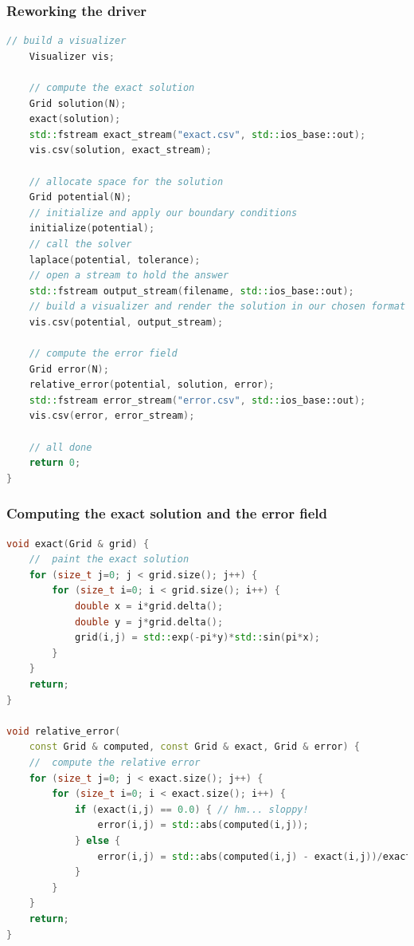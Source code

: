 \begin{frame}[fragile]
%
  \frametitle{Reworking the driver}
%
  \begin{lstlisting}[language=c++,basicstyle=\tt\bfseries\tiny,name=seq:driver,firstnumber=239]
    // build a visualizer
    Visualizer vis;

    // compute the exact solution
    Grid solution(N);
    exact(solution);
    std::fstream exact_stream("exact.csv", std::ios_base::out);
    vis.csv(solution, exact_stream);
    
    // allocate space for the solution
    Grid potential(N);
    // initialize and apply our boundary conditions
    initialize(potential);
    // call the solver
    laplace(potential, tolerance);
    // open a stream to hold the answer
    std::fstream output_stream(filename, std::ios_base::out);
    // build a visualizer and render the solution in our chosen format
    vis.csv(potential, output_stream);

    // compute the error field
    Grid error(N);
    relative_error(potential, solution, error);
    std::fstream error_stream("error.csv", std::ios_base::out);
    vis.csv(error, error_stream);

    // all done
    return 0;
}
  \end{lstlisting}
%
\end{frame}

\begin{frame}[fragile]
% 
  \frametitle{Computing the exact solution and the error field}
%
  \begin{lstlisting}[language=c++,firstnumber=143]
void exact(Grid & grid) {
    //  paint the exact solution
    for (size_t j=0; j < grid.size(); j++) {
        for (size_t i=0; i < grid.size(); i++) {
            double x = i*grid.delta();
            double y = j*grid.delta();
            grid(i,j) = std::exp(-pi*y)*std::sin(pi*x);
        }
    }
    return;
}

void relative_error(
    const Grid & computed, const Grid & exact, Grid & error) {
    //  compute the relative error
    for (size_t j=0; j < exact.size(); j++) {
        for (size_t i=0; i < exact.size(); i++) {
            if (exact(i,j) == 0.0) { // hm... sloppy!
                error(i,j) = std::abs(computed(i,j));
            } else {
                error(i,j) = std::abs(computed(i,j) - exact(i,j))/exact(i,j);
            }
        }
    }
    return;
}

  \end{lstlisting}
%
\end{frame}

